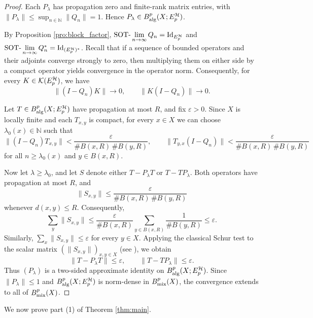 \documentclass[11pt,reqno]{amsart}
\theoremstyle{definition}
\theoremstyle{plain}
\def\IN{\mathbb N}\def\IR{\mathbb R}\def\IE{\mathbb E}\def\IC{\mathbb C}\def\IL{\mathbb L}\def\IQ{\mathbb Q}\def\IA{\mathbb A}\def\IZ{\mathbb Z}
\begin{document}
\begin{proof}
Each $P_\lambda$ has propagation zero and finite-rank matrix entries, with $\|P_\lambda\|\le\sup_{n\in\IN}\|Q_n\|=1$. Hence $P_\lambda\in B^p_{\textup{alg}}(X;E_p^{\mathcal H})$.

By Proposition \ref{pro:block_factor}, $\textup{SOT-}\lim\limits_{n\to\infty} Q_n = \textup{Id}_{E_p^{\mathcal H}}$ and $\textup{SOT-}\lim\limits_{n\to\infty} Q^*_n = \textup{Id}_{(E_p^{\mathcal H})^*}$. Recall that if a sequence of bounded operators and their adjoints converge strongly to zero, then multiplying them on either side by a compact operator yields convergence in the operator norm. Consequently, for every $K\in\mathcal K(E_p^{\mathcal H})$, we have
\[
\|(I-Q_n)K\|\to 0,\qquad \|K(I-Q_n)\|\to 0.
\]


Let $T\in B^p_{\textup{alg}}(X;E_p^{\mathcal H})$ have propagation at most $R$, and fix $\varepsilon>0$. Since $X$ is locally finite and each $T_{x,y}$ is compact, for every $x\in X$ we can choose $\lambda_0(x)\in\IN$ such that
\[
\|(I-Q_n)T_{x,y}\|<\frac{\varepsilon}{\#B(x,R)\,\#B(y,R)},\qquad \|T_{y,x}(I-Q_n)\|<\frac{\varepsilon}{\#B(x,R)\,\#B(y,R)}
\]
for all $n\ge\lambda_0(x)$ and $y\in B(x,R)$.

Now let $\lambda\ge\lambda_0$, and let $S$ denote either $T-P_\lambda T$ or $T-TP_\lambda$. Both operators have propagation at most $R$, and
\[
\|S_{x,y}\|\le\frac{\varepsilon}{\#B(x,R)\,\#B(y,R)}
\]
whenever $d(x,y)\le R$. Consequently,
\[
\sum_y\|S_{x,y}\|\le\frac{\varepsilon}{\#B(x,R)}\sum_{y\in B(x,R)}\frac{1}{\#B(y,R)}\le\varepsilon.
\]
Similarly, $\sum_x\|S_{x,y}\|\le\varepsilon$ for every $y\in X$. Applying the classical Schur test to the scalar matrix $(\|S_{x,y}\|)_{x,y\in X}$ (see \cite[Proposition 3.1]{GPT24}), we obtain
\[
\|T-P_\lambda T\|\le\varepsilon,\qquad \|T-TP_\lambda\|\le\varepsilon.
\]
Thus $(P_\lambda)$ is a two-sided approximate identity on $B^p_{\textup{alg}}(X;E_p^{\mathcal H})$. Since $\|P_\lambda\|\le 1$ and $B^p_{\textup{alg}}(X;E_p^{\mathcal H})$ is norm-dense in $B^p_{\textup{mix}}(X)$, the convergence extends to all of $B^p_{\textup{mix}}(X)$.
\end{proof}

We now prove part (1) of Theorem \ref{thm:main}.
\end{document}
